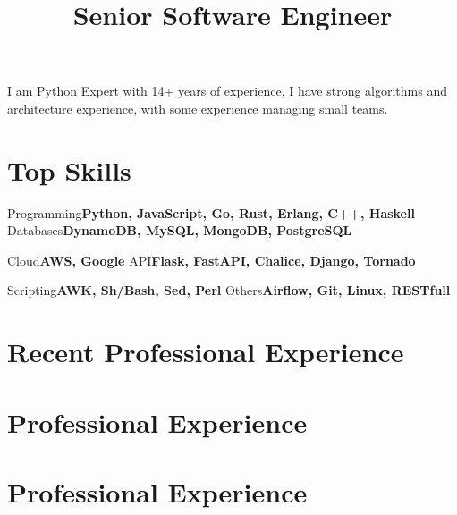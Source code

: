 \documentclass[11pt,a4paper]{moderncv}
\title{Senior Software Engineer}
\begin{document}

\maketitle

I am Python Expert with 14+ years of experience, I have strong algorithms and
architecture experience, with some experience managing small teams.

\section{Top Skills}

    \cvcomputer
        {Programming}{\textbf{Python, JavaScript, Go, Rust, Erlang, C++, Haskell}}
        {Databases}{\textbf{DynamoDB, MySQL, MongoDB, PostgreSQL}}

    \cvcomputer
        {Cloud}{\textbf{AWS, Google}}
        {API}{\textbf{Flask, FastAPI, Chalice, Django, Tornado}}

    \cvcomputer
        {Scripting}{\textbf{AWK, Sh/Bash, Sed, Perl}}
        {Others}{\textbf{Airflow, Git, Linux, RESTfull}}


\section{Recent Professional Experience}                                                                          %
\section{Professional Experience}                                                                                 %
\section{Professional Experience}                                                                                 %
\end{document}
